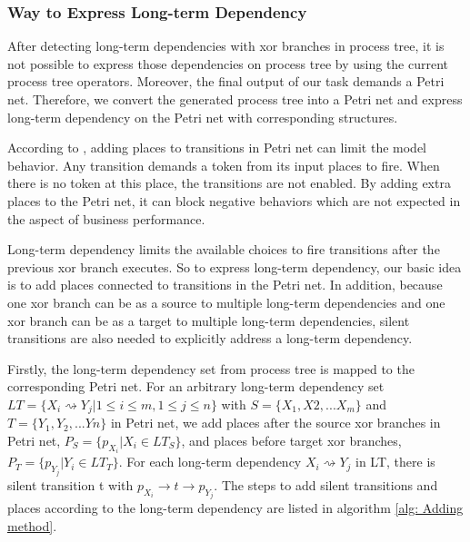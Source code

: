 \subsubsection{Way to Express Long-term Dependency}
After detecting long-term dependencies with xor branches in process tree, it is not possible to express those dependencies on process tree by using the current process tree operators. Moreover, the final output of our task demands a Petri net. Therefore, we convert the generated process tree into a Petri net and express long-term dependency on the Petri net with corresponding structures.

According to \cite{bergenthum2007process}, adding places to transitions in Petri net can limit the model behavior. Any transition demands a token from its input places to fire. When there is no token at this place, the transitions are not enabled. By adding extra places to the Petri net, it can block negative behaviors which are not expected in the aspect of business performance. 

Long-term dependency limits the available choices to fire transitions after the previous xor branch executes. So to express long-term dependency, our basic idea is to add places connected to transitions in the Petri net. In addition, because one xor branch can be as a source to multiple long-term dependencies and one xor branch can be as a target to multiple long-term dependencies, silent transitions are also needed to explicitly address a long-term dependency. 


Firstly, the long-term dependency set from process tree is mapped to the corresponding Petri net. For an arbitrary long-term dependency set $LT=\{X_i \rightsquigarrow Y_j \vert 1 \leq i \leq m, 1 \leq j \leq n \}$ with $S=\{X_1,X2,...X_m\}$ and $T=\{Y_1,Y_2,...Yn\}$ in Petri net, we add places after the source xor branches in Petri net,  $P_S=\{p_{X_i} \vert X_i \in LT_{S} \}$, and places before target xor branches,$P_T=\{p_{Y_j} \vert Y_i \in LT_{T} \}$. For each long-term dependency $X_{i} \rightsquigarrow Y_{j}$ in LT, there is silent transition t with $p_{X_i} \rightarrow t \rightarrow p_{Y_{j}}$. The steps to add silent transitions and places according to the long-term dependency are listed in algorithm \ref{alg: Adding method}.

